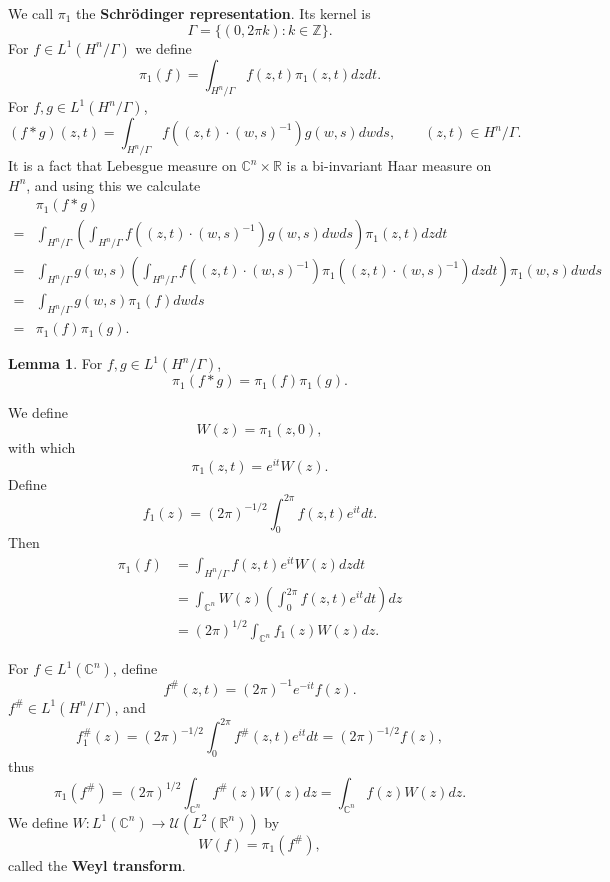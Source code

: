 \documentclass{article}
\theoremstyle{definition}
\newtheorem{lemma}[theorem]{Lemma}
\theoremstyle{definition}
\begin{document}
We call $\pi_1$ the \textbf{Schr\"odinger representation}. Its kernel is
 \[
 \Gamma=\{(0,2\pi k): k \in \mathbb{Z}\}.
 \]
 For $f \in L^1(H^n/\Gamma)$ we define
 \[
 \pi_1(f) = \int_{H^n/\Gamma} f(z,t) \pi_1(z,t) dz dt.
 \]
For $f,g \in L^1(H^n/\Gamma)$,
\[
(f*g)(z,t) = \int_{H^n/\Gamma} f((z,t) \cdot (w,s)^{-1}) g(w,s) dw ds, \qquad (z,t) \in H^n/\Gamma.
\] 
It is a fact that Lebesgue measure on $\mathbb{C}^n \times \mathbb{R}$ is a 
bi-invariant Haar measure on $H^n$, and using this we calculate
\[
\begin{split}
&\pi_1(f*g)\\
=&\int_{H^n/\Gamma} \left(  \int_{H^n/\Gamma} f((z,t) \cdot (w,s)^{-1}) g(w,s) dw ds\right) \pi_1(z,t) dz dt\\
=&\int_{H^n/\Gamma} g(w,s) \left( \int_{H^n/\Gamma}  f((z,t) \cdot (w,s)^{-1}) \pi_1((z,t)\cdot (w,s)^{-1})
  dz dt \right) \pi_1(w,s) dw ds\\
=&\int_{H^n/\Gamma} g(w,s) \pi_1(f) dw ds\\
=&\pi_1(f) \pi_1(g).
\end{split}
\]

\begin{lemma}
For $f,g \in L^1(H^n/\Gamma)$,
\[
\pi_1(f*g) = \pi_1(f) \pi_1(g).
\]
\end{lemma}
 
 We define
 \[
 W(z) = \pi_1(z,0),
 \]
with which
\[
\pi_1(z,t) = e^{it} W(z).
\]
Define
\[
f_1(z) = (2\pi)^{-1/2} \int_0^{2\pi} f(z,t) e^{it} dt.
\]
Then
\begin{align*}
\pi_1(f) &= \int_{H^n/\Gamma} f(z,t) e^{it} W(z) dz dt\\
&=
\int_{\mathbb{C}^n} W(z) \left( \int_0^{2\pi} f(z,t) e^{it} dt \right) dz\\
&=(2\pi)^{1/2} \int_{\mathbb{C}^n}  f_1(z) W(z) dz.
\end{align*}


For $f \in L^1(\mathbb{C}^n)$, define
\[
f^{\#}(z,t) = (2\pi)^{-1} e^{-it} f(z).
\]
$f^{\#} \in  L^1(H^n/\Gamma)$, and
\[
f^{\#}_1(z) = (2\pi)^{-1/2} \int_0^{2\pi} f^{\#}(z,t) e^{it} dt = 
(2\pi)^{-1/2} f(z),
\]
thus
\[
\pi_1(f^{\#}) =(2\pi)^{1/2} \int_{\mathbb{C}^n} f^{\#}(z) W(z) dz
=\int_{\mathbb{C}^n} f(z) W(z) dz.
\]
We define $W:L^1(\mathbb{C}^n) \to \mathscr{U}(L^2(\mathbb{R}^n))$ by
\[
W(f) = \pi_1(f^{\#}),
\]
called the \textbf{Weyl transform}.
\end{document}
